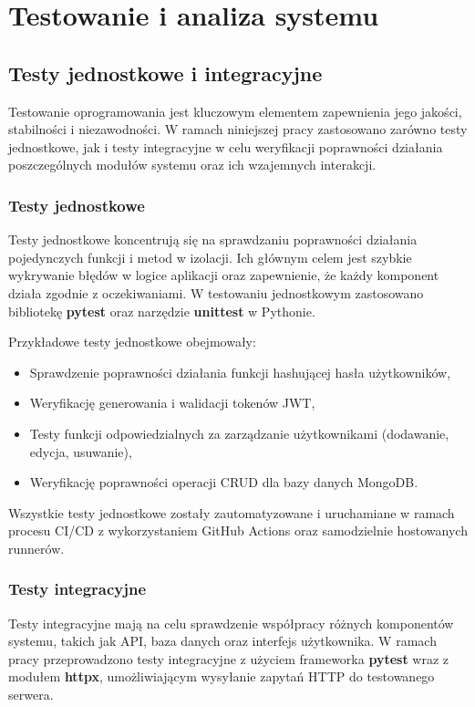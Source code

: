 \chapter{Testowanie i analiza systemu}

\section{Testy jednostkowe i integracyjne}
Testowanie oprogramowania jest kluczowym elementem zapewnienia jego jakości, stabilności i niezawodności. W ramach niniejszej pracy zastosowano zarówno testy jednostkowe, jak i testy integracyjne w celu weryfikacji poprawności działania poszczególnych modułów systemu oraz ich wzajemnych interakcji.

\subsection{Testy jednostkowe}

Testy jednostkowe koncentrują się na sprawdzaniu poprawności działania pojedynczych funkcji i metod w izolacji. Ich głównym celem jest szybkie wykrywanie błędów w logice aplikacji oraz zapewnienie, że każdy komponent działa zgodnie z oczekiwaniami. W testowaniu jednostkowym zastosowano bibliotekę \textbf{pytest} oraz narzędzie \textbf{unittest} w Pythonie.

Przykładowe testy jednostkowe obejmowały:
\begin{itemize}
    \item Sprawdzenie poprawności działania funkcji hashującej hasła użytkowników,
    \item Weryfikację generowania i walidacji tokenów JWT,
    \item Testy funkcji odpowiedzialnych za zarządzanie użytkownikami (dodawanie, edycja, usuwanie),
    \item Weryfikację poprawności operacji CRUD dla bazy danych MongoDB.
\end{itemize}

Wszystkie testy jednostkowe zostały zautomatyzowane i uruchamiane w ramach procesu CI/CD z wykorzystaniem GitHub Actions oraz samodzielnie hostowanych runnerów.

\subsection{Testy integracyjne}

Testy integracyjne mają na celu sprawdzenie współpracy różnych komponentów systemu, takich jak API, baza danych oraz interfejs użytkownika. W ramach pracy przeprowadzono testy integracyjne z użyciem frameworka \textbf{pytest} wraz z modułem \textbf{httpx}, umożliwiającym wysyłanie zapytań HTTP do testowanego serwera.

